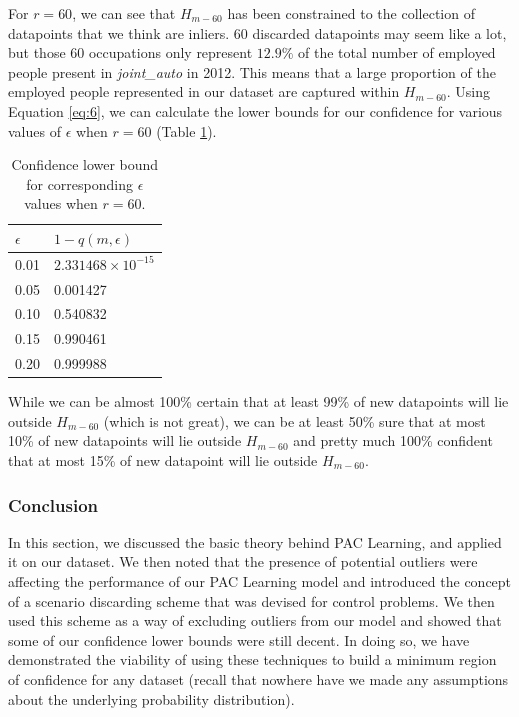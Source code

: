 \documentclass[11pt]{article}
\begin{document}
For $r=60$, we can see that $H_{m-60}$ has been constrained to the collection of datapoints that we think are inliers. 60 discarded datapoints may seem like a lot, but those 60 occupations only represent $12.9\%$ of the total number of employed people present in \emph{joint\_auto} in 2012. This means that a large proportion of the employed people represented in our dataset are captured within $H_{m-60}$. Using Equation \ref{eq:6}, we can calculate the lower bounds for our confidence for various values of $\epsilon$ when $r=60$ (Table \ref{tab:confidence2}).

\begin{table}[]
\centering
\begin{tabular}{l|l}
\textbf{$\epsilon$} & \textbf{$1-q(m,\epsilon)$} \\ \hline
0.01             & $2.331468\times10^{-15}$ \\ \hline
0.05             & 0.001427 \\ \hline
0.10             & 0.540832 \\ \hline
0.15             & 0.990461 \\ \hline
0.20             & 0.999988
\end{tabular}
\caption{Confidence lower bound for corresponding $\epsilon$ values when $r=60$.}
\label{tab:confidence2}
\end{table}

While we can be almost 100\% certain that at least 99\% of new datapoints will lie outside $H_{m-60}$ (which is not great), we can be at least 50\% sure that at most 10\% of new datapoints will lie outside $H_{m-60}$ and pretty much 100\% confident that at most 15\% of new datapoint will lie outside $H_{m-60}$.

\subsubsection*{Conclusion}
In this section, we discussed the basic theory behind PAC Learning, and applied it on our dataset. We then noted that the presence of potential outliers were affecting the performance of our PAC Learning model and introduced the concept of a scenario discarding scheme that was devised for control problems. We then used this scheme as a way of excluding outliers from our model and showed that some of our confidence lower bounds were still decent. In doing so, we have demonstrated the viability of using these techniques to build a minimum region of confidence for any dataset (recall that nowhere have we made any assumptions about the underlying probability distribution).
\end{document}
